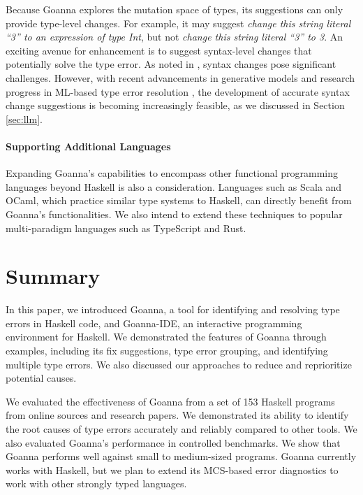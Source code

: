 \documentclass[pdflatex,lineno,sn-nature,Numbered]{sn-jnl}%
\begin{document}
Because Goanna explores the mutation space of types, its suggestions can only provide type-level changes. For example, it may suggest {\it change this string literal ``3'' to an expression of type Int}, but not {\it change this string literal ``3'' to 3}.  An exciting avenue for enhancement is to suggest syntax-level changes that potentially solve the type error. As noted in \cite{Chen2014-dz}, syntax changes pose significant challenges. However, with recent advancements in generative models and research progress in ML-based type error resolution \cite{Seidel2017-uf}, the development of accurate syntax change suggestions is becoming increasingly feasible, as we discussed in Section \ref{sec:llm}.

\paragraph{Supporting Additional Languages}

Expanding Goanna's capabilities to encompass other functional programming languages beyond Haskell is also a consideration. Languages such as Scala and OCaml, which practice similar type systems to Haskell, can directly benefit from Goanna's functionalities. We also intend to extend these techniques to popular multi-paradigm languages such as TypeScript and Rust.



\section{Summary} \label{sec:conclusion}

In this paper, we introduced Goanna, a tool for identifying and resolving type errors in Haskell code, and Goanna-IDE, an interactive programming environment for Haskell. We demonstrated the features of Goanna through examples, including its fix suggestions, type error grouping, and identifying multiple type errors. We also discussed our approaches to reduce and reprioritize potential causes.

We evaluated the effectiveness of Goanna from a set of 153 Haskell programs from online sources and research papers. We demonstrated its ability to identify the root causes of type errors accurately and reliably compared to other tools. We also evaluated Goanna's performance in controlled benchmarks. We show that Goanna performs well against small to medium-sized programs. Goanna currently works with Haskell, but we plan to extend its MCS-based error diagnostics to work with other strongly typed languages.
\end{document}
